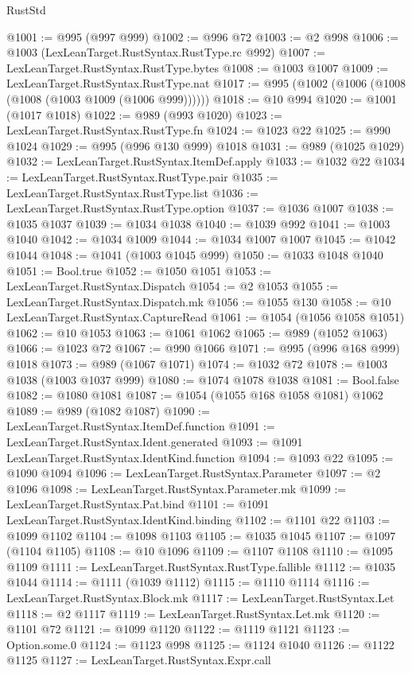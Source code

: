 \begin{lexlean}{RustStd}
\begin{coremodule}
@1001 := @995 (@997 @999)
@1002 := @996 @72
@1003 := @2 @998
@1006 := @1003 (LexLeanTarget.RustSyntax.RustType.rc @992)
@1007 := LexLeanTarget.RustSyntax.RustType.bytes
@1008 := @1003 @1007
@1009 := LexLeanTarget.RustSyntax.RustType.nat
@1017 := @995 (@1002 (@1006 (@1008 (@1008 (@1003 @1009 (@1006 @999))))))
@1018 := @10 @994
@1020 := @1001 (@1017 @1018)
@1022 := @989 (@993 @1020)
@1023 := LexLeanTarget.RustSyntax.RustType.fn
@1024 := @1023 @22
@1025 := @990 @1024
@1029 := @995 (@996 @130 @999) @1018
@1031 := @989 (@1025 @1029)
@1032 := LexLeanTarget.RustSyntax.ItemDef.apply
@1033 := @1032 @22
@1034 := LexLeanTarget.RustSyntax.RustType.pair
@1035 := LexLeanTarget.RustSyntax.RustType.list
@1036 := LexLeanTarget.RustSyntax.RustType.option
@1037 := @1036 @1007
@1038 := @1035 @1037
@1039 := @1034 @1038
@1040 := @1039 @992
@1041 := @1003 @1040
@1042 := @1034 @1009
@1044 := @1034 @1007 @1007
@1045 := @1042 @1044
@1048 := @1041 (@1003 @1045 @999)
@1050 := @1033 @1048 @1040
@1051 := Bool.true
@1052 := @1050 @1051
@1053 := LexLeanTarget.RustSyntax.Dispatch
@1054 := @2 @1053
@1055 := LexLeanTarget.RustSyntax.Dispatch.mk
@1056 := @1055 @130
@1058 := @10 LexLeanTarget.RustSyntax.CaptureRead
@1061 := @1054 (@1056 @1058 @1051)
@1062 := @10 @1053
@1063 := @1061 @1062
@1065 := @989 (@1052 @1063)
@1066 := @1023 @72
@1067 := @990 @1066
@1071 := @995 (@996 @168 @999) @1018
@1073 := @989 (@1067 @1071)
@1074 := @1032 @72
@1078 := @1003 @1038 (@1003 @1037 @999)
@1080 := @1074 @1078 @1038
@1081 := Bool.false
@1082 := @1080 @1081
@1087 := @1054 (@1055 @168 @1058 @1081) @1062
@1089 := @989 (@1082 @1087)
@1090 := LexLeanTarget.RustSyntax.ItemDef.function
@1091 := LexLeanTarget.RustSyntax.Ident.generated
@1093 := @1091 LexLeanTarget.RustSyntax.IdentKind.function
@1094 := @1093 @22
@1095 := @1090 @1094
@1096 := LexLeanTarget.RustSyntax.Parameter
@1097 := @2 @1096
@1098 := LexLeanTarget.RustSyntax.Parameter.mk
@1099 := LexLeanTarget.RustSyntax.Pat.bind
@1101 := @1091 LexLeanTarget.RustSyntax.IdentKind.binding
@1102 := @1101 @22
@1103 := @1099 @1102
@1104 := @1098 @1103
@1105 := @1035 @1045
@1107 := @1097 (@1104 @1105)
@1108 := @10 @1096
@1109 := @1107 @1108
@1110 := @1095 @1109
@1111 := LexLeanTarget.RustSyntax.RustType.fallible
@1112 := @1035 @1044
@1114 := @1111 (@1039 @1112)
@1115 := @1110 @1114
@1116 := LexLeanTarget.RustSyntax.Block.mk
@1117 := LexLeanTarget.RustSyntax.Let
@1118 := @2 @1117
@1119 := LexLeanTarget.RustSyntax.Let.mk
@1120 := @1101 @72
@1121 := @1099 @1120
@1122 := @1119 @1121
@1123 := Option.some.{0}
@1124 := @1123 @998
@1125 := @1124 @1040
@1126 := @1122 @1125
@1127 := LexLeanTarget.RustSyntax.Expr.call

\end{coremodule}
\end{lexlean}
